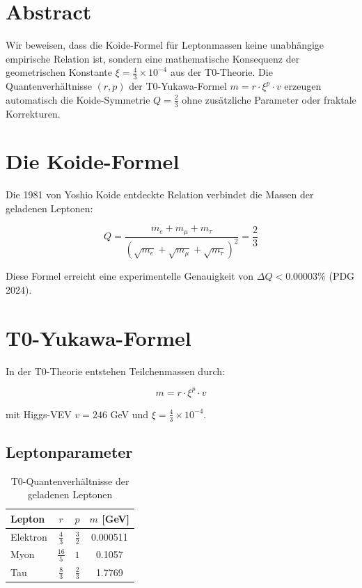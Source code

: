 \section*{Abstract}
		Wir beweisen, dass die Koide-Formel für Leptonmassen keine unabhängige empirische Relation ist, sondern eine mathematische Konsequenz der geometrischen Konstante $\xi = \frac{4}{3} \times 10^{-4}$ aus der T0-Theorie. Die Quantenverhältnisse $(r,p)$ der T0-Yukawa-Formel $m = r \cdot \xi^p \cdot v$ erzeugen automatisch die Koide-Symmetrie $Q = \frac{2}{3}$ ohne zusätzliche Parameter oder fraktale Korrekturen.

	
	\section{Die Koide-Formel}
	
	Die 1981 von Yoshio Koide entdeckte Relation verbindet die Massen der geladenen Leptonen:
	
	\begin{equation}
		Q = \frac{m_e + m_\mu + m_\tau}{\left( \sqrt{m_e} + \sqrt{m_\mu} + \sqrt{m_\tau} \right)^2} = \frac{2}{3}
		\label{eq:koide}
	\end{equation}
	
	Diese Formel erreicht eine experimentelle Genauigkeit von $\Delta Q < 0.00003\%$ (PDG 2024).
	
	\section{T0-Yukawa-Formel}
	
	In der T0-Theorie entstehen Teilchenmassen durch:
	
	\begin{equation}
		m = r \cdot \xi^p \cdot v
		\label{eq:t0yukawa}
	\end{equation}
	
	mit Higgs-VEV $v = 246$ GeV und $\xi = \frac{4}{3} \times 10^{-4}$.
	
	\subsection{Leptonparameter}
	
	\begin{table}[h]
		\centering
		\begin{tabular}{lccc}
			\toprule
			\textbf{Lepton} & \textbf{$r$} & \textbf{$p$} & \textbf{$m$ [GeV]} \\
			\midrule
			Elektron & $\frac{4}{3}$ & $\frac{3}{2}$ & 0.000511 \\
			Myon & $\frac{16}{5}$ & $1$ & 0.1057 \\
			Tau & $\frac{8}{3}$ & $\frac{2}{3}$ & 1.7769 \\
			\bottomrule
		\end{tabular}
		\caption{T0-Quantenverhältnisse der geladenen Leptonen}
	\end{table}
	
